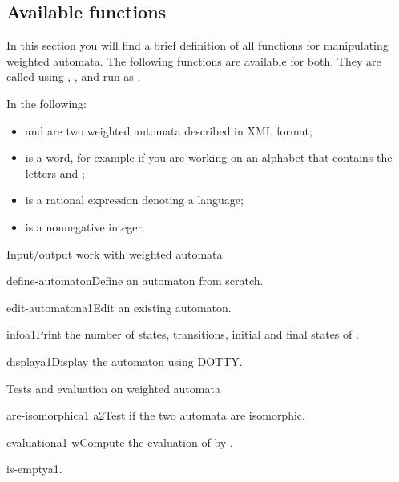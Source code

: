 \subsection{Available functions}
In this section you will find a brief definition of all functions for
manipulating weighted automata. The following functions are available
for both.  They are called using ,
, and  run as
.

\smallskip

In the following:

\begin{itemize}
\item {} and  are two weighted automata described in
  \Vauc XML format;
\item {} is a word, for example  if you are working on
  an alphabet that contains the letters  and ;
\item {} is a rational expression denoting a language;
\item {} is a nonnegative integer.
\end{itemize}


\begin{fnsection}{Input/output work with weighted automata}
\item{define-automaton}{}{Define an automaton from scratch.}
\item{edit-automaton}{a1}{Edit an existing automaton.}
\item{info}{a1}{Print the number of states, transitions, initial and
    final states of .}
\item{display}{a1}{Display the automaton using DOTTY.}  \hline
\end{fnsection}

\begin{fnsection}{Tests and evaluation on weighted automata}
\item{are-isomorphic}{a1 a2}{Test if the two automata are isomorphic.}
\item{evaluation}{a1 w}{Compute the evaluation of  by
    .}
\item{is-empty}{a1}{.}  \hline
\end{fnsection}

